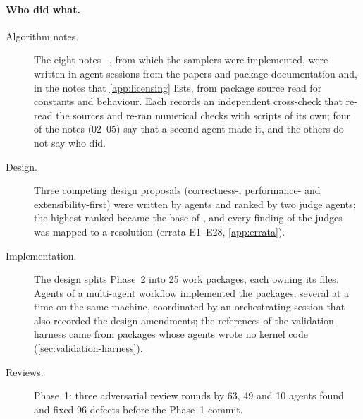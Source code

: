 \paragraph{Who did what.}
\begin{description}
\item[Algorithm notes.] The eight notes --, from which the samplers were
implemented, were written in agent sessions from the papers and package documentation and, in the
notes that \cref{app:licensing} lists, from package source read for constants and behaviour.
Each records an independent cross-check that re-read the sources and re-ran numerical checks with
scripts of its own; four of the notes (02--05) say that a second agent made it, and the others do
not say who did.
\item[Design.] Three competing design proposals (correctness-, performance- and extensibility-first)
were written by agents and ranked by two judge agents; the highest-ranked became the base of
, and every finding of the judges was mapped to a resolution (errata
E1--E28, \cref{app:errata}).
\item[Implementation.] The design splits Phase~2 into 25 work packages, each owning its files.
Agents of a multi-agent workflow implemented the packages, several at a time on the same machine,
coordinated by an orchestrating session that also recorded the design amendments; the references of
the validation harness came from packages whose agents wrote no kernel code
(\cref{sec:validation-harness}).
\item[Reviews.] Phase~1: three adversarial review rounds by 63, 49 and 10 agents found and fixed 96
defects before the Phase~1 commit.

\end{description}
